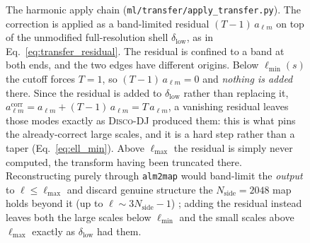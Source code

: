 \documentclass{report}
\begin{document}
\begin{figure}[h!]
\centering
{}
\caption{The harmonic apply chain (\texttt{ml/transfer/apply\_transfer.py}). The correction is applied as a band-limited residual $(T-1)\,a_{\ell m}$ on top of the unmodified full-resolution shell $\delta_{\mathrm{low}}$, as in Eq.~\eqref{eq:transfer_residual}. The residual is confined to a band at both ends, and the two edges have different origins. Below \mbox{$\ell_{\min}(s)$} the cutoff forces \mbox{$T = 1$}, so \mbox{$(T-1)\,a_{\ell m} = 0$} and \emph{nothing is added} there. Since the residual is added to $\delta_{\mathrm{low}}$ rather than replacing it, \mbox{$a_{\ell m}^{\mathrm{corr}} = a_{\ell m} + (T-1)\,a_{\ell m} = T\,a_{\ell m}$}, a vanishing residual leaves those modes exactly as \textsc{Disco-DJ} produced them: this is what pins the already-correct large scales, and it is a hard step rather than a taper (Eq.~\ref{eq:ell_min}). Above \mbox{$\ell_{\max}$} the residual is simply never computed, the transform having been truncated there. Reconstructing purely through \texttt{alm2map} would band-limit the \emph{output} to $\ell \le \ell_{\max}$ and discard genuine structure the $N_{\mathrm{side}}{=}2048$ map holds beyond it (up to $\ell \sim 3N_{\mathrm{side}}{-}1$) \cite{sullivan_methods_2024}; adding the residual instead leaves both the large scales below \mbox{$\ell_{\min}$} and the small scales above \mbox{$\ell_{\max}$} exactly as $\delta_{\mathrm{low}}$ had them.}
\label{fig:transfer_flow}
\end{figure}
\end{document}
